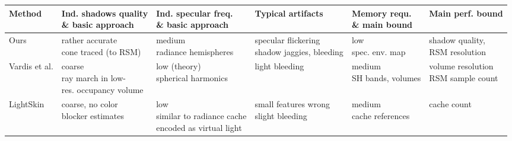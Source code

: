 \documentclass[thesis.tex]{subfiles}
\begin{document}
\begin{landscape}
\newcommand{\specialVspace}{\vspace{0.5cm}}

\begin{table}[h]
\centering
\begin{tabular}{llllll}
\toprule
Method  & \makecell[l]{Ind. shadows quality\\ \& basic approach} & \makecell[l]{Ind. specular freq.\\ \& basic approach} & Typical artifacts & \makecell[l]{Memory requ.\\ \& main bound} & Main perf. bound\\
\midrule

\specialVspace

Ours    & \makecell[l]{rather accurate\\cone traced (to RSM)}& \makecell[l]{medium \\ radiance hemispheres} & \makecell[l]{specular flickering \\ shadow jaggies, bleeding } & \makecell[l]{low\\spec. env. map} & \makecell[l]{shadow quality, \\ RSM resolution}\\

\specialVspace

\makecell[l]{Vardis et al. \\ \cite{bib:radiancecachechromaticcompression} } & \makecell[l]{coarse\\ray march in low-\\ res. occupancy volume} & \makecell[l]{low (theory)\\spherical harmonics} & light bleeding & \makecell[l]{medium\\SH bands, volumes} & \makecell[l]{volume resolution\\RSM sample count} \\

\specialVspace

\makecell[l]{LightSkin \\ \cite{bib:LightskinPaper}} & \makecell[l]{coarse, no color\\blocker estimates} & \makecell[l]{low\\similar to radiance cache\\encoded as virtual light} &  \makecell[l]{small features wrong \\ slight bleeding} & \makecell[l]{medium\\cache references} & cache count \\


\end{tabular}
\end{table}
\end{landscape}
\end{document}
